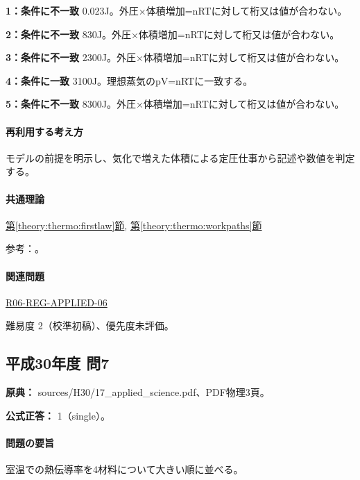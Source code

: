 \noindent\textbf{1：条件に不一致} 0.023J。外圧×体積増加=nRTに対して桁又は値が合わない。\par

\noindent\textbf{2：条件に不一致} 830J。外圧×体積増加=nRTに対して桁又は値が合わない。\par

\noindent\textbf{3：条件に不一致} 2300J。外圧×体積増加=nRTに対して桁又は値が合わない。\par

\noindent\textbf{4：条件に一致} 3100J。理想蒸気のpV=\allowbreak{}nRTに一致する。\par

\noindent\textbf{5：条件に不一致} 8300J。外圧×体積増加=nRTに対して桁又は値が合わない。\par

\paragraph{再利用する考え方} モデルの前提を明示し、気化で増えた体積による定圧仕事から記述や数値を判定する。

\paragraph{共通理論} \hyperref[theory:thermo:firstlaw]{第\ref*{theory:thermo:firstlaw}節}, \hyperref[theory:thermo:workpaths]{第\ref*{theory:thermo:workpaths}節}

\par 参考：\cite{mit_thermo_firstlaw2008}。

\paragraph{関連問題} \hyperref[q:r06-reg-applied-06]{R06-REG-APPLIED-06}

\par 難易度 2（校準初稿）、優先度未評価。

\subsection{平成30年度 問7}
\label{q:h30-reg-applied-07}

\noindent\textbf{原典：} sources/H30/17\_applied\_science.pdf、PDF物理3頁。

\textbf{公式正答：} 1（single）。

\paragraph{問題の要旨} 室温での熱伝導率を4材料について大きい順に並べる。


